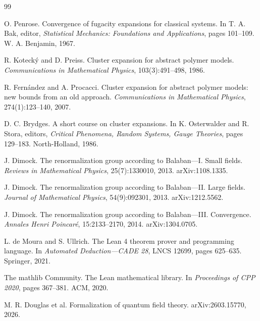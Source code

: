 \documentclass[11pt]{article}
\begin{document}
\begin{thebibliography}{99}

O. Penrose.
\newblock Convergence of fugacity expansions for classical systems.
\newblock In T. A. Bak, editor, \emph{Statistical Mechanics: Foundations and Applications}, pages 101--109. W. A. Benjamin, 1967.

R. Koteck\'y and D. Preiss.
\newblock Cluster expansion for abstract polymer models.
\newblock \emph{Communications in Mathematical Physics}, 103(3):491--498, 1986.

R. Fern\'andez and A. Procacci.
\newblock Cluster expansion for abstract polymer models: new bounds from an old approach.
\newblock \emph{Communications in Mathematical Physics}, 274(1):123--140, 2007.

D. C. Brydges.
\newblock A short course on cluster expansions.
\newblock In K. Osterwalder and R. Stora, editors, \emph{Critical Phenomena, Random Systems, Gauge Theories}, pages 129--183. North-Holland, 1986.

J. Dimock.
\newblock The renormalization group according to Balaban---I. Small fields.
\newblock \emph{Reviews in Mathematical Physics}, 25(7):1330010, 2013. arXiv:1108.1335.

J. Dimock.
\newblock The renormalization group according to Balaban---II. Large fields.
\newblock \emph{Journal of Mathematical Physics}, 54(9):092301, 2013. arXiv:1212.5562.

J. Dimock.
\newblock The renormalization group according to Balaban---III. Convergence.
\newblock \emph{Annales Henri Poincar\'e}, 15:2133--2170, 2014. arXiv:1304.0705.

L. de Moura and S. Ullrich.
\newblock The Lean 4 theorem prover and programming language.
\newblock In \emph{Automated Deduction---CADE 28}, LNCS 12699, pages 625--635. Springer, 2021.

The mathlib Community.
\newblock The Lean mathematical library.
\newblock In \emph{Proceedings of CPP 2020}, pages 367--381. ACM, 2020.

M. R. Douglas et al.
\newblock Formalization of quantum field theory.
\newblock arXiv:2603.15770, 2026.


\end{thebibliography}
\end{document}
